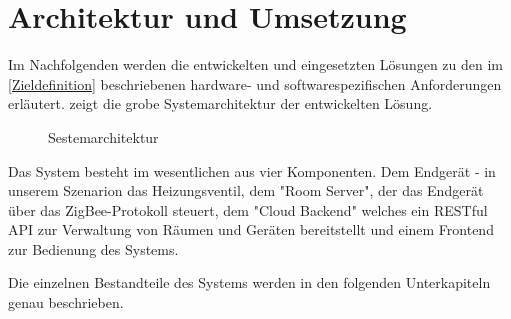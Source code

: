 \section{Architektur und Umsetzung}

Im Nachfolgenden werden die entwickelten und eingesetzten Lösungen zu den im \autoref{Zieldefinition} beschriebenen hardware- und softwarespezifischen Anforderungen erläutert.  zeigt
die grobe Systemarchitektur der entwickelten Lösung.


\begin{figure}[htb]
\centering
{}
\caption{Sestemarchitektur}
\label{fig:DD}
\end{figure}

Das System besteht im wesentlichen aus vier Komponenten. Dem Endgerät - in unserem Szenarion das Heizungsventil, dem "Room Server", der das Endgerät über das ZigBee-Protokoll steuert, dem "Cloud Backend" welches ein RESTful API zur Verwaltung von Räumen und Geräten bereitstellt und einem Frontend zur Bedienung des Systems.

Die einzelnen Bestandteile des Systems werden in den folgenden Unterkapiteln genau beschrieben. 




